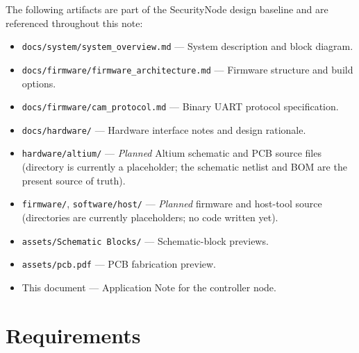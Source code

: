 \documentclass[11pt,a4paper]{article}
\begin{document}
The following artifacts are part of the SecurityNode design baseline and are
referenced throughout this note:

\begin{itemize}
    \item \texttt{docs/system/system\_overview.md} --- System description and block diagram.
    \item \texttt{docs/firmware/firmware\_architecture.md} --- Firmware structure and build options.
    \item \texttt{docs/firmware/cam\_protocol.md} --- Binary UART protocol specification.
    \item \texttt{docs/hardware/} --- Hardware interface notes and design rationale.
    \item \texttt{hardware/altium/} --- \emph{Planned} Altium schematic and PCB source files (directory is currently a placeholder; the schematic netlist and BOM are the present source of truth).
    \item \texttt{firmware/}, \texttt{software/host/} --- \emph{Planned} firmware and host-tool source (directories are currently placeholders; no code written yet).
    \item \texttt{assets/Schematic Blocks/} --- Schematic-block previews.
    \item \texttt{assets/pcb.pdf} --- PCB fabrication preview.
    \item This document --- Application Note for the controller node.
\end{itemize}

\section{Requirements}
\end{document}
